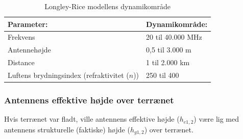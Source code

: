\begin{table}[h]
 \centering
 \begin{tabular}{ll}
   Parameter:                                   & Dynamikområde:\\
   \hline
   Frekvens                                     & 20 til 40.000 MHz\\
   Antennehøjde                                 & 0,5 til 3.000 m \\
   Distance                                     & 1 til 2.000 km \\
   Luftens brydningsindex (refraktivitet ($n$)) & 250 til 400 \\
 \end{tabular}
 \caption{Longley-Rice modellens dynamikområde}
 \label{tab:lr-range}
\end{table}

\subsubsection{Antennens effektive højde over terrænet}
Hvis terrænet var fladt, ville antennens effektive højde ($h_{e1,2}$) være lig med antennens strukturelle (faktiske) højde ($h_{g1,2}$) over terrænet.  
